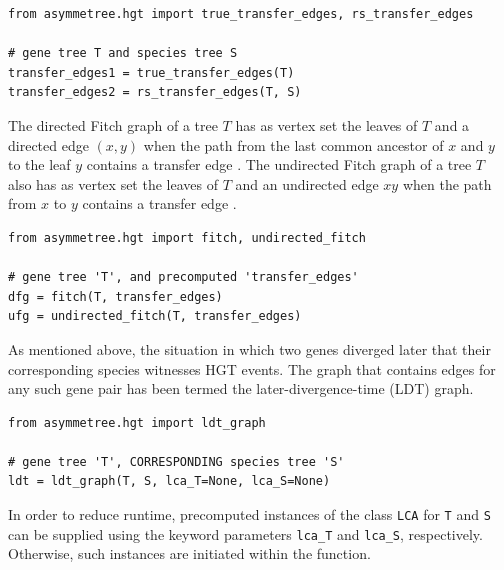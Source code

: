 \documentclass[hidelinks,11pt]{article}
\begin{document}
\begin{adjustwidth}{1cm}{1cm}\vspace{2mm}
\begin{verbatim}
from asymmetree.hgt import true_transfer_edges, rs_transfer_edges

# gene tree T and species tree S
transfer_edges1 = true_transfer_edges(T)
transfer_edges2 = rs_transfer_edges(T, S)
\end{verbatim}
\end{adjustwidth}

The directed Fitch graph of a tree $T$ has as vertex set the leaves of $T$ and 
a directed edge $(x,y)$ when the path from the last common ancestor of 
$x$ and $y$ to the leaf $y$ contains a transfer edge \cite{geiss2018}.
The undirected Fitch graph of a tree $T$ also has as vertex set the leaves of 
$T$ and an undirected edge $xy$ when the path from $x$ to $y$ contains a 
transfer edge \cite{hellmuth2018}.

\begin{adjustwidth}{1cm}{1cm}\vspace{2mm}
\begin{verbatim}
from asymmetree.hgt import fitch, undirected_fitch

# gene tree 'T', and precomputed 'transfer_edges' 
dfg = fitch(T, transfer_edges)
ufg = undirected_fitch(T, transfer_edges)
\end{verbatim}
\end{adjustwidth}

As mentioned above, the situation in which two genes diverged later that their 
corresponding species witnesses HGT events.
The graph that contains edges for any such gene pair has been termed the 
later-divergence-time (LDT) graph.

\begin{adjustwidth}{1cm}{1cm}\vspace{2mm}
\begin{verbatim}
from asymmetree.hgt import ldt_graph

# gene tree 'T', CORRESPONDING species tree 'S' 
ldt = ldt_graph(T, S, lca_T=None, lca_S=None)
\end{verbatim}
\end{adjustwidth}
In order to reduce runtime, precomputed instances of the class 
\texttt{LCA} for \texttt{T} and \texttt{S} 
can be supplied using the keyword parameters \texttt{lca\_T}
and \texttt{lca\_S}, respectively. Otherwise, such instances are initiated 
within the function.
\end{document}
